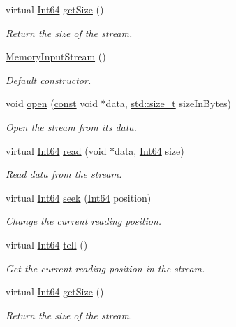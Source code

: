 \begin{DoxyCompactItemize}
virtual \hyperlink{namespacesf_a2840579fed3494d9f330baf7a5a19903}{Int64} \hyperlink{classsf_1_1_memory_input_stream_a6ade3ca45de361ffa0a718595f0b6763}{get\-Size} ()
\begin{DoxyCompactList}\small\item\em Return the size of the stream. \end{DoxyCompactList}\item 
\hyperlink{classsf_1_1_memory_input_stream_a2d78851a69a8956a79872be41bcdfe0e}{Memory\-Input\-Stream} ()
\begin{DoxyCompactList}\small\item\em Default constructor. \end{DoxyCompactList}\item 
void \hyperlink{classsf_1_1_memory_input_stream_ad3cfb4f4f915f7803d6a0784e394ac19}{open} (\hyperlink{term__entry_8h_a57bd63ce7f9a353488880e3de6692d5a}{const} void $\ast$data, \hyperlink{nc__alloc_8h_a7b60c5629e55e8ec87a4547dd4abced4}{std\-::size\-\_\-t} size\-In\-Bytes)
\begin{DoxyCompactList}\small\item\em Open the stream from its data. \end{DoxyCompactList}\item 
virtual \hyperlink{namespacesf_a2840579fed3494d9f330baf7a5a19903}{Int64} \hyperlink{classsf_1_1_memory_input_stream_adff5270c521819639154d42d76fd4c34}{read} (void $\ast$data, \hyperlink{namespacesf_a2840579fed3494d9f330baf7a5a19903}{Int64} size)
\begin{DoxyCompactList}\small\item\em Read data from the stream. \end{DoxyCompactList}\item 
virtual \hyperlink{namespacesf_a2840579fed3494d9f330baf7a5a19903}{Int64} \hyperlink{classsf_1_1_memory_input_stream_aa2ac8fda2bdb4c95248ae90c71633034}{seek} (\hyperlink{namespacesf_a2840579fed3494d9f330baf7a5a19903}{Int64} position)
\begin{DoxyCompactList}\small\item\em Change the current reading position. \end{DoxyCompactList}\item 
virtual \hyperlink{namespacesf_a2840579fed3494d9f330baf7a5a19903}{Int64} \hyperlink{classsf_1_1_memory_input_stream_a7ad4bdf721f29de8f66421ff29e23ee4}{tell} ()
\begin{DoxyCompactList}\small\item\em Get the current reading position in the stream. \end{DoxyCompactList}\item 
virtual \hyperlink{namespacesf_a2840579fed3494d9f330baf7a5a19903}{Int64} \hyperlink{classsf_1_1_memory_input_stream_a6ade3ca45de361ffa0a718595f0b6763}{get\-Size} ()
\begin{DoxyCompactList}\small\item\em Return the size of the stream. \end{DoxyCompactList}\end{DoxyCompactItemize}


